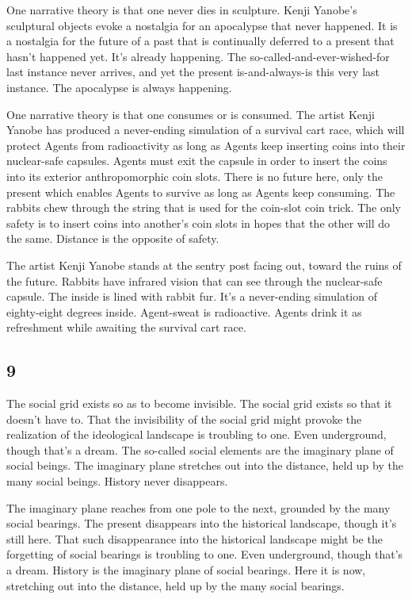 One narrative theory is that one never dies in sculpture. Kenji Yanobe's
sculptural objects evoke a nostalgia for an apocalypse that never
happened. It is a nostalgia for the future of a past that is continually
deferred to a present that hasn't happened yet. It's already happening.
The so-called-and-ever-wished-for last instance never arrives, and yet
the present is-and-always-is this very last instance. The apocalypse is
always happening.

One narrative theory is that one consumes or is consumed. The artist
Kenji Yanobe has produced a never-ending simulation of a survival cart
race, which will protect Agents from radioactivity as long as Agents
keep inserting coins into their nuclear-safe capsules. Agents must exit
the capsule in order to insert the coins into its exterior
anthropomorphic coin slots. There is no future here, only the present
which enables Agents to survive as long as Agents keep consuming. The
rabbits chew through the string that is used for the coin-slot coin
trick. The only safety is to insert coins into another's coin slots in
hopes that the other will do the same. Distance is the opposite of
safety.

The artist Kenji Yanobe stands at the sentry post facing out, toward the
ruins of the future. Rabbits have infrared vision that can see through
the nuclear-safe capsule. The inside is lined with rabbit fur. It's a
never-ending simulation of eighty-eight degrees inside. Agent-sweat is
radioactive. Agents drink it as refreshment while awaiting the survival
cart race.

\hypertarget{section-10}{%
\subsection{9}\label{section-10}}

The social grid exists so as to become invisible. The social grid exists
so that it doesn't have to. That the invisibility of the social grid
might provoke the realization of the ideological landscape is troubling
to one. Even underground, though that's a dream. The so-called social
elements are the imaginary plane of social beings. The imaginary plane
stretches out into the distance, held up by the many social beings.
History never disappears.

The imaginary plane reaches from one pole to the next, grounded by the
many social bearings. The present disappears into the historical
landscape, though it's still here. That such disappearance into the
historical landscape might be the forgetting of social bearings is
troubling to one. Even underground, though that's a dream. History is
the imaginary plane of social bearings. Here it is now, stretching out
into the distance, held up by the many social bearings.

